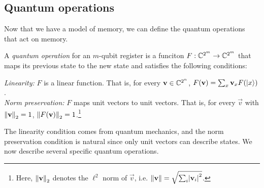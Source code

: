 \documentclass[12pt]{article}
\begin{document}
\subsection{Quantum operations}
Now that we have a model of memory, we can define the quantum operations that
act on memory.
\begin{defn}
  \label{defn:op}
  A \emph{quantum operation} for an $m$-qubit register is a funciton $F :
  \CC^{2^m} \to \CC^{2^m}$ that maps its previous state to the new state and
  satisfies the following conditions:
  \begin{adjustwidth}{0.25in}{0in}
    \emph{Linearity:} $F$ is a linear function. That is, for every $\vec{v} \in
    \CC^{2^n}$, $F(\vec{v}) = \sum_x \vec{v}_x F(\reg*{x})$. \\
    \emph{Norm preservation:} $F$ maps unit vectors to unit vectors. That is,
    for every $\vec{v}$ with $\norm*{\vec{v}}_2=1$,
    $\norm*{F(\vec{v})}_2=1$.\footnote{Here, $\norm*{\vec{v}}_2$ denotes the
    $\ell^2$ norm of $\vec{v}$, i.e. $\norm*{\vec{v}} = \sqrt{\sum_i
    \abs*{\vec{v}_i}^2}$.}
  \end{adjustwidth}
\end{defn}
The linearity condition comes from quantum mechanics, and the norm preservation
condition is natural since only unit vectors can describe states. We now
describe several specific quantum operations.
\end{document}
